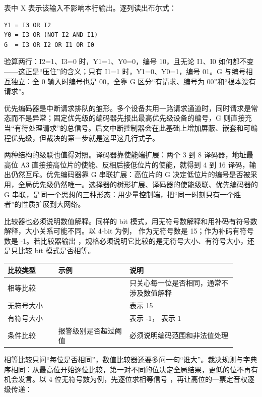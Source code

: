 表中 X 表示该输入不影响本行输出。逐列读出布尔式：

\begin{lstlisting}
Y1 = I3 OR I2
Y0 = I3 OR (NOT I2 AND I1)
G  = I3 OR I2 OR I1 OR I0
\end{lstlisting}

验算两行：I2=1、I3=0 时，Y1=1、Y0=0，编号 10，且无论 I1、I0 如何都不变——这正是“压住”的含义；只有 I1=1 时，Y1=0、Y0=1，编号 01。G 与编号相互独立：全 0 输入时编号也是 00，全靠 G 区分“有请求、编号为 00”和“根本没有请求”。

优先编码器是中断请求排队的雏形。多个设备共用一路请求通道时，同时请求是常态而不是异常；固定优先级的编码器先报出最高优先级设备的编号，G 则直接充当“有待处理请求”的总信号。后文中断控制器会在此基础上增加屏蔽、嵌套和可编程优先级，但裁决的第一步就是这里这几行式子。

两种结构的级联也值得对照。译码器靠使能端扩展：两个 3 到 8 译码器，地址最高位 A3 直接接高位片的使能、反相后接低位片的使能，就得到 4 到 16 译码，输出仍然互斥。优先编码器靠 G 串联扩展：高位片的 G 决定低位片的编号是否被采用，全局优先级仍然唯一。选择器的树形扩展、译码器的使能级联、优先编码器的 G 串联，是同一个思想的三种形态：用少量控制端，把“同一时刻只有一个胜者”的性质扩展到大网络。

比较器也必须说明数值解释。同样的 bit 模式，用无符号数解释和用补码有符号数解释，大小关系可能不同。以 4-bit 为例， 作为无符号数是 15；作为补码有符号数是 -1。若比较器输出 ，规格必须说明它比较的是无符号大小、有符号大小，还是只比较 bit 模式是否相等。

\begin{longtable}{L{0.2\linewidth}L{0.28\linewidth}L{0.42\linewidth}}
\toprule
比较类型 & 示例 & 说明 \\
\midrule
相等比较 &  & 只关心每一位是否相同，通常不涉及数值解释 \\
无符号大小 &  &  表示 15 \\
有符号大小 &  &  表示 -1， 表示 1 \\
条件比较 & 报警级别是否超过阈值 & 必须说明编码范围和非法值处理 \\
\bottomrule
\end{longtable}

相等比较只问“每位是否相同”，数值比较器还要多问一句“谁大”。裁决规则与字典序相同：从最高位开始逐位比较，第一对不同的位决定全局结果，更低的位不再有机会发言。以 4 位无符号数为例，先逐位求相等信号 ，再让高位的一票定音权逐级传递：

